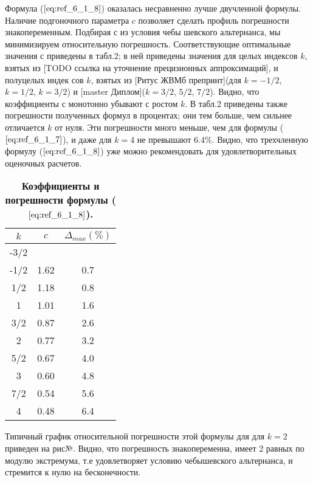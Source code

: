 Формула ($\ref{eq:ref_6_1_8}$) оказалась несравненно лучше двучленной формулы. Наличие подгоночного параметра $c$ 
позволяет сделать профиль погрешности знакопеременным. Подбирая $с$ из условия чебы
шевского альтернанса, мы минимизируем относительную погрешность. Соответствующие оптимальные
значения $с$ приведены в табл.2; в ней приведены значения для целых индексов $k$,
взятых из [TODO ссылка на уточнение прецизионных аппроксимаций], и полуцелых индек
сов $k$, взятых из [Ритус ЖВМб препринт](для $k=-1/2$, $k=1/2$, $k=3/2$) и [master Диплом]($k=3/2$, $5/2$, $7/2$). Видно, что коэффициенты $с$ монотонно убывают с ростом $k$. В
табл.2 приведены также погрешности полученных формул в процентах; они тем больше,
чем сильнее отличается $k$ от нуля. Эти погрешности много меньше, чем для формулы
($\ref{eq:ref_6_1_7}$), и даже для $k=4$ не превышают $6.4\%$. Видно, что трехчленную формулу ($\ref{eq:ref_6_1_8}$) уже можно рекомендовать для удовлетворительных оценочных расчетов. 

\begin{table}[]
\caption{\textbf{Коэффициенты и погрешности формулы ($\ref{eq:ref_6_1_8}$).}}
\begin{center}
\begin{tabular}{|c|c|c|}
\hline
$k$ & $c$ & $\Delta_{max} (\%)$ \\
\hline
-3/2 & & \\
-1/2 & 1.62 & 0.7 \\
 1/2 & 1.18 & 0.8 \\
 1   & 1.01 & 1.6 \\
 3/2 & 0.87 & 2.6 \\
  2  & 0.77 & 3.2 \\
 5/2 & 0.67 & 4.0 \\
  3  & 0.60 & 4.8 \\
 7/2 & 0.54 & 5.6 \\
  4  & 0.48 & 6.4 \\
\hline
\end{tabular}
\end{center}
\end{table}

Типичный график относительной погрешности этой формулы для для $k = 2$ приведен на рис№. Видно, что погрешность знакопеременна, имеет 2 равных по модулю экстремума, т.е удовлетворяет условию чебышевского альтернанса, и стремится к нулю на бесконечности.
\\

